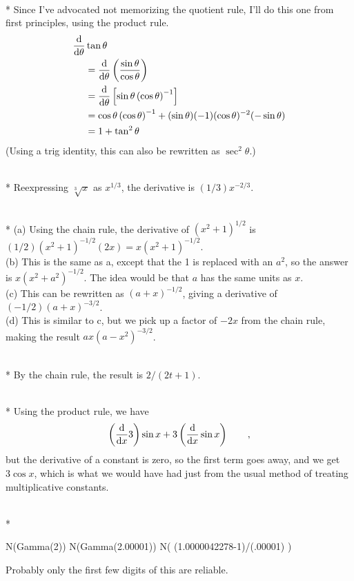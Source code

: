 \\*
Since I've advocated not memorizing the quotient rule, I'll do this one from first principles,
using the product rule.
\begin{align*}
  \frac{\textup{d}}{\textup{d} \theta}& \tan\theta \\
        &=   \frac{\textup{d}}{\textup{d} \theta}\left(\frac{\sin\theta}{\cos\theta}\right) \\
        &=   \frac{\textup{d}}{\textup{d} \theta}\left[\sin\theta\left(\cos\theta\right)^{-1}\right] \\
        &=   \cos\theta\left(\cos\theta\right)^{-1}+(\sin\theta)(-1)(\cos\theta)^{-2}(-\sin\theta)\\
        &=   1+\tan^2\theta
\end{align*}
(Using a trig identity, this can also be rewritten as $\sec^2\theta$.)

\\*
Reexpressing $\sqrt[3]{x}$ as $x^{1/3}$, the derivative is $(1/3)x^{-2/3}$.

\\*
(a) Using the chain rule, the derivative of $(x^2+1)^{1/2}$ is $(1/2)(x^2+1)^{-1/2}(2x)=x(x^2+1)^{-1/2}$.\\
(b) This is the same as a, except that the 1 is replaced with an $a^2$, so the answer is $x(x^2+a^2)^{-1/2}$. The idea
would be that $a$ has the same units as $x$.\\
(c) This can be rewritten as $(a+x)^{-1/2}$, giving a derivative of $(-1/2)(a+x)^{-3/2}$.\\
(d) This is similar to c, but we pick up a factor of $-2x$ from the chain rule, making the result
$ax(a-x^2)^{-3/2}$.

\\*
By the chain rule, the result is $2/(2t+1)$.

\\*
Using the product rule, we have
\begin{equation*}
  \left(\frac{\textup{d}}{\textup{d} x}3\right)\sin x + 3\left(\frac{\textup{d}}{\textup{d} x}\sin x\right) \qquad ,
\end{equation*}
but the derivative of a constant is zero, so the first term goes away, and we get $3\cos x$, which
is what we would have had just from the usual method of treating multiplicative constants.


\\*
\restartLineNumbers
\begin{Code}
  \ii N(Gamma(2))
  \ii N(Gamma(2.00001))
  \ii N( (1.0000042278-1)/(.00001) )
\end{Code}
Probably only the first few digits of this are reliable.

